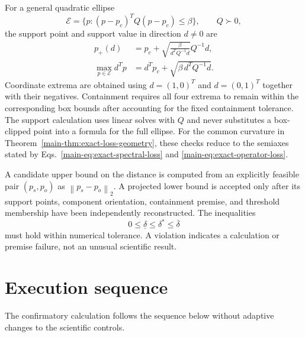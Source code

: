 \documentclass[11pt]{article}
\newcommand{\norm}[1]{\left\lVert #1\right\rVert}
\begin{document}
For a general quadratic ellipse
\[
 \mathcal E=\{p:(p-p_c)^TQ(p-p_c)\le\beta\},
 \qquad Q\succ0,
\]
the support point and support value in direction $d\ne0$ are
\begin{align}
 p_+(d)&=p_c+
 \sqrt{\frac{\beta}{d^TQ^{-1}d}}Q^{-1}d,\\
 \max_{p\in\mathcal E}d^Tp
 &=d^Tp_c+\sqrt{\beta\,d^TQ^{-1}d}.
\end{align}
Coordinate extrema are obtained using $d=(1,0)^T$ and $d=(0,1)^T$ together with their
negatives. Containment requires all four extrema to remain within the corresponding box
bounds after accounting for the fixed containment tolerance. The support calculation
uses linear solves with $Q$ and never substitutes a box-clipped point into a formula for
the full ellipse. For the common curvature in
Theorem~\ref{main-thm:exact-loss-geometry}, these checks reduce to the semiaxes stated by
Eqs.~\eqref{main-eq:exact-spectral-loss} and \eqref{main-eq:exact-operator-loss}.

A candidate upper bound on the distance is computed from an explicitly feasible pair
$(p_s,p_o)$ as $\norm{p_s-p_o}_2$. A projected lower bound is accepted only after its
support points, component orientation, containment premise, and threshold membership
have been independently reconstructed. The inequalities
\[
 0\le\underline\delta\le\delta^*\le\overline\delta
\]
must hold within numerical tolerance. A violation indicates a calculation or premise
failure, not an unusual scientific result.

\section{Execution sequence}

The confirmatory calculation follows the sequence below without adaptive changes to the
scientific controls.
\end{document}
